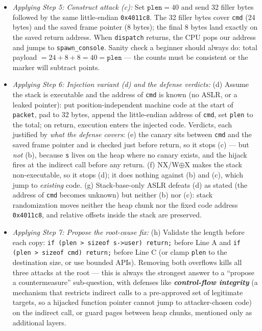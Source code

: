 \documentclass[12pt, a4paper]{article}
\newcommand{\term}[1]{\textbf{\textit{#1}}}        %
\begin{document}
\begin{itemize}
    \item \textit{Applying Step 5: Construct attack (c):} Set $\texttt{plen} = 40$ and send 32 filler bytes followed by the same little-endian \texttt{0x4011c8}. The 32 filler bytes cover \texttt{cmd} (24 bytes) and the saved frame pointer (8 bytes); the final 8 bytes land exactly on the saved return address. When \texttt{dispatch} returns, the CPU pops our address and jumps to \texttt{spawn\_console}. Sanity check a beginner should always do: total payload $= 24 + 8 + 8 = 40 = \texttt{plen}$ --- the counts must be consistent or the marker will subtract points.
    \item \textit{Applying Step 6: Injection variant (d) and the defense verdicts:} (d) Assume the stack is executable and the address of \texttt{cmd} is known (no ASLR, or a leaked pointer): put position-independent machine code at the start of \texttt{packet}, pad to 32 bytes, append the little-endian address of \texttt{cmd}, set \texttt{plen} to the total; on return, execution enters the injected code. Verdicts, each justified by \emph{what the defense covers}: (e) the canary sits between \texttt{cmd} and the saved frame pointer and is checked just before return, so it stops (c) --- but \emph{not} (b), because \texttt{s} lives on the heap where no canary exists, and the hijack fires at the indirect call before any return. (f) NX/W$\oplus$X makes the stack non-executable, so it stops (d); it does nothing against (b) and (c), which jump to \emph{existing} code. (g) Stack-base-only ASLR defeats (d) as stated (the address of \texttt{cmd} becomes unknown) but neither (b) nor (c): stack randomization moves neither the heap chunk nor the fixed code address \texttt{0x4011c8}, and relative offsets inside the stack are preserved.
    \item \textit{Applying Step 7: Propose the root-cause fix:} (h) Validate the length before each copy: \texttt{if (plen > sizeof s->user) return;} before Line A and \texttt{if (plen > sizeof cmd) return;} before Line C (or clamp \texttt{plen} to the destination size, or use bounded APIs). Removing both overflows kills all three attacks at the root --- this is always the strongest answer to a ``propose a countermeasure'' sub-question, with defenses like \term{control-flow integrity} (a mechanism that restricts indirect calls to a pre-approved set of legitimate targets, so a hijacked function pointer cannot jump to attacker-chosen code) on the indirect call, or guard pages between heap chunks, mentioned only as additional layers.
\end{itemize}
\end{document}
